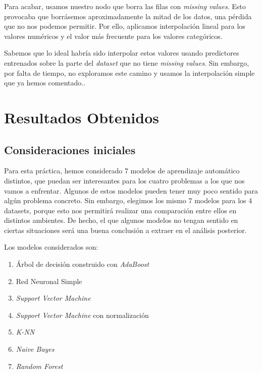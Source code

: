 \documentclass[11pt]{article}
\begin{document}
Para acabar, usamos nuestro nodo que borra las filas con \emph{missing values}. Esto provocaba que borrásemos aproximadamente la mitad de los datos, una pérdida que no nos podemos permitir. Por ello, aplicamos interpolación lineal para los valores numéricos y el valor más frecuente para los valores categóricos.

Sabemos que lo ideal habría sido interpolar estos valores usando predictores entrenados sobre la parte del \emph{dataset} que no tiene \emph{missing values}. Sin embargo, por falta de tiempo, no exploramos este camino y usamos la interpolación simple que ya hemos comentado..

\pagebreak

\section{Resultados Obtenidos} \label{resultados_brutos:seccion}

\subsection{Consideraciones iniciales} \label{cv_consideraciones:seccion}

Para esta práctica, hemos considerado 7 modelos de aprendizaje automático distintos, que puedan ser interesantes para los cuatro problemas a los que nos vamos a enfrentar. Algunos de estos modelos pueden tener muy poco sentido para algún problema concreto. Sin embargo, elegimos los mismo 7 modelos para los 4 datasets, porque esto nos permitirá realizar una comparación entre ellos en distintos ambientes. De hecho, el que algunos modelos no tengan sentido en ciertas situaciones será una buena conclusión a extraer en el análisis posterior.

Los modelos considerados son:

\begin{enumerate}
    \item Árbol de decisión construido con \emph{AdaBoost}
    \item Red Neuronal Simple
    \item \emph{Support Vector Machine}
    \item \emph{Support Vector Machine} con normalización
    \item \emph{K-NN}
    \item \emph{Naive Bayes}
    \item \emph{Random Forest}
\end{enumerate}
\end{document}
